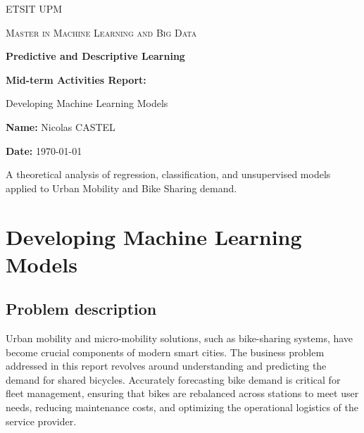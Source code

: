 \documentclass[12pt,a4paper]{article}
\begin{document}
\begin{titlepage}
    \centering
    \vspace*{2cm}
    {\scshape\LARGE ETSIT UPM \par}
    \vspace{1cm}
    {\scshape\Large Master in Machine Learning and Big Data\par}
    \vspace{1.5cm}
    {\huge\bfseries Predictive and Descriptive Learning\par}
    \vspace{0.5cm}
    {\Large\bfseries Mid-term Activities Report: \par Developing Machine Learning Models\par}
    \vspace{2cm}
    {\Large \textbf{Name:} Nicolas CASTEL\par}
    \vspace{0.5cm}
    {\large \textbf{Date:} \today\par}
    \vfill
    {\large A theoretical analysis of regression, classification, and unsupervised models applied to Urban Mobility and Bike Sharing demand.\par}
    \vspace{2cm}
\end{titlepage}

\tableofcontents
\newpage
\listoftables
\listoffigures
\newpage

\section{Developing Machine Learning Models}
\subsection{Problem description}
Urban mobility and micro-mobility solutions, such as bike-sharing systems, have become crucial components of modern smart cities. The business problem addressed in this report revolves around understanding and predicting the demand for shared bicycles. Accurately forecasting bike demand is critical for fleet management, ensuring that bikes are rebalanced across stations to meet user needs, reducing maintenance costs, and optimizing the operational logistics of the service provider.
\end{document}
